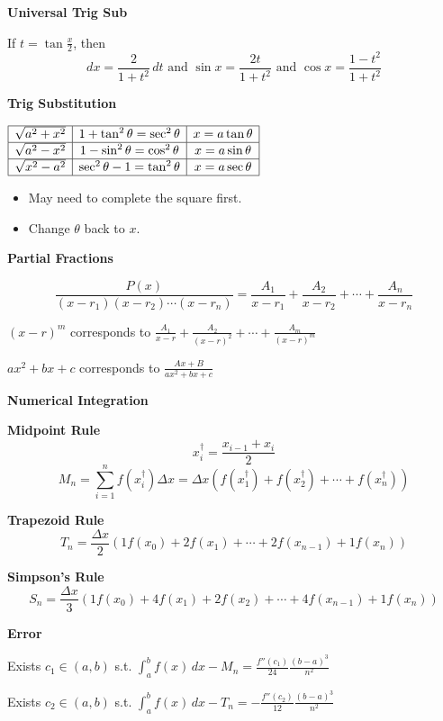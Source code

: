 \documentclass[10pt]{article}
\newcommand\sectionheading[1]{\begin{center}\large{\textbf{#1}}\end{center}\normalsize}
\newcommand\heading[1]{\smallskip\textbf{#1}\smallskip}
\begin{document}
\begin{multicols*}{3}
\heading{Universal Trig Sub}

If $\displaystyle t=\tan\frac x2$, then 
\[dx=\frac{2}{1+t^2}\,dt \text{ and } \sin x=\frac{2t}{1+t^2} \text{ and } \cos x=\frac{1-t^2}{1+t^2}\]

\heading{Trig Substitution}

$\begin{array}{|c|c|c|}
    \hline
    \sqrt{a^2+x^2} & 1+\tan^2\theta=\sec^2\theta & x=a\tan\theta \\
    \hline
    \sqrt{a^2-x^2} & 1-\sin^2\theta=\cos^2\theta & x=a\sin\theta \\
    \hline
    \sqrt{x^2-a^2} & \sec^2\theta-1=\tan^2\theta & x=a\sec\theta \\
    \hline
\end{array}$

\begin{itemize}[noitemsep,topsep=0pt]
    \item May need to complete the square first.
    \item Change $\theta$ back to $x$. 
\end{itemize}

\heading{Partial Fractions}

{\footnotesize
\[\frac{P(x)}{(x-r_1)(x-r_2)\cdots(x-r_n)}=\frac{A_1}{x-r_1}+\frac{A_2}{x-r_2}+\cdots+\frac{A_n}{x-r_n}\]}

$(x-r)^m$ corresponds to $\displaystyle\frac{A_1}{x-r}+\frac{A_2}{(x-r)^2}+\cdots+\frac{A_m}{(x-r)^m}$

$ax^2+bx+c$ corresponds to $\frac{Ax+B}{ax^2+bx+c}$

\sectionheading{Numerical Integration}

\heading{Midpoint Rule}
\[x_i^\dagger=\frac{x_{i-1}+x_i}{2}\]
\[M_n=\sum_{i=1}^{n}f(x_i^{\dagger})\Delta x=\Delta x(f(x_1^{\dagger})+f(x_2^{\dagger})+\cdots+f(x_n^\dagger))\]

\heading{Trapezoid Rule}
{\small
\[T_n = \frac{\Delta x}{2}(1f(x_0)+2f(x_1)+\cdots+2f(x_{n-1})+1f(x_n))\]}

\heading{Simpson's Rule}
{\footnotesize
\[S_n=\frac{\Delta x}{3}(1f(x_0)+4f(x_1)+2f(x_2)+\cdots+4f(x_{n-1})+1f(x_n))\]}

\heading{Error}

Exists $c_1\in(a,b)$ s.t. $\displaystyle\int_{a}^{b}f(x)\,dx-M_n=\frac{f''(c_1)}{24}\frac{(b-a)^3}{n^2}$

Exists $c_2\in(a,b)$ s.t. $\displaystyle\int_{a}^{b}f(x)\,dx-T_n=-\frac{f''(c_2)}{12}\frac{(b-a)^3}{n^2}$


\end{multicols*}
\end{document}

